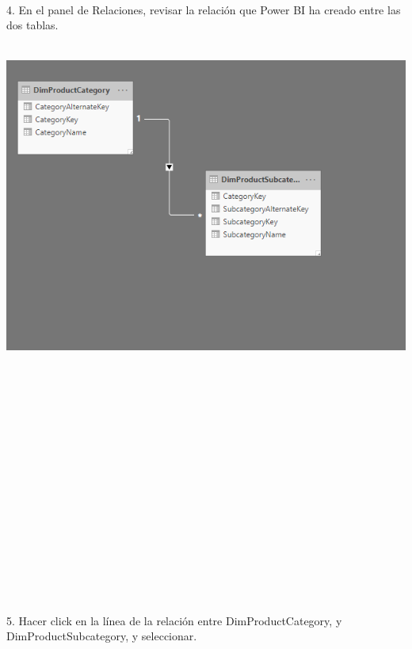 \begin{flushleft}
\begin{itemize}
\textbf{ }\\
\textbf{ }\\
\textbf{ }\\
\textbf{ }\\
\textbf{ }\\
\textbf{ }\\
\textbf{ }\\
\textbf{ }\\
4. En el panel de Relaciones, revisar la relación que Power BI ha creado entre las dos tablas.\\
\textbf{ }\\
\begin{center}
	\includegraphics[width=20cm]{./Imagenes/img22} 
	\end{center}
\textbf{ }\\
\textbf{ }\\
\textbf{ }\\
\textbf{ }\\
\textbf{ }\\
\textbf{ }\\
\textbf{ }\\
\textbf{ }\\
\textbf{ }\\
\textbf{ }\\
\textbf{ }\\
\textbf{ }\\
\textbf{ }\\
\textbf{ }\\
\textbf{ }\\
\textbf{ }\\
5. Hacer click en la línea de la relación entre DimProductCategory, y DimProductSubcategory, y seleccionar. \\


\end{itemize}
\end{flushleft}
